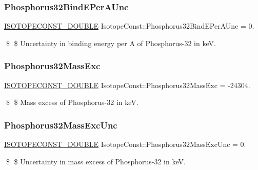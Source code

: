 \subsubsection{\texorpdfstring{Phosphorus32\+Bind\+E\+Per\+A\+Unc}{Phosphorus32BindEPerAUnc}}
{\footnotesize\ttfamily \mbox{\hyperlink{group___isotope_const-_macros_ga8f45a7272ce02c0b4c65c44636ed719a}{I\+S\+O\+T\+O\+P\+E\+C\+O\+N\+S\+T\+\_\+\+D\+O\+U\+B\+LE}} Isotope\+Const\+::\+Phosphorus32\+Bind\+E\+Per\+A\+Unc = 0.}

\$ \$ Uncertainty in binding energy per A of Phosphorus-\/32 in keV. \mbox{\label{group___isotope_const-_phosphorus-_p32_ga104ba41b939749b416ad29f7a1874abc}} 
\subsubsection{\texorpdfstring{Phosphorus32\+Mass\+Exc}{Phosphorus32MassExc}}
{\footnotesize\ttfamily \mbox{\hyperlink{group___isotope_const-_macros_ga8f45a7272ce02c0b4c65c44636ed719a}{I\+S\+O\+T\+O\+P\+E\+C\+O\+N\+S\+T\+\_\+\+D\+O\+U\+B\+LE}} Isotope\+Const\+::\+Phosphorus32\+Mass\+Exc = -\/24304.}

\$ \$ Mass excess of Phosphorus-\/32 in keV. \mbox{\label{group___isotope_const-_phosphorus-_p32_ga8471793abb98110c0b89d985ca7a18a3}} 
\subsubsection{\texorpdfstring{Phosphorus32\+Mass\+Exc\+Unc}{Phosphorus32MassExcUnc}}
{\footnotesize\ttfamily \mbox{\hyperlink{group___isotope_const-_macros_ga8f45a7272ce02c0b4c65c44636ed719a}{I\+S\+O\+T\+O\+P\+E\+C\+O\+N\+S\+T\+\_\+\+D\+O\+U\+B\+LE}} Isotope\+Const\+::\+Phosphorus32\+Mass\+Exc\+Unc = 0.}

\$ \$ Uncertainty in mass excess of Phosphorus-\/32 in keV. \mbox{\label{group___isotope_const-_phosphorus-_p32_gaea4b1470edd42d71d125eaa302342c52}} 
